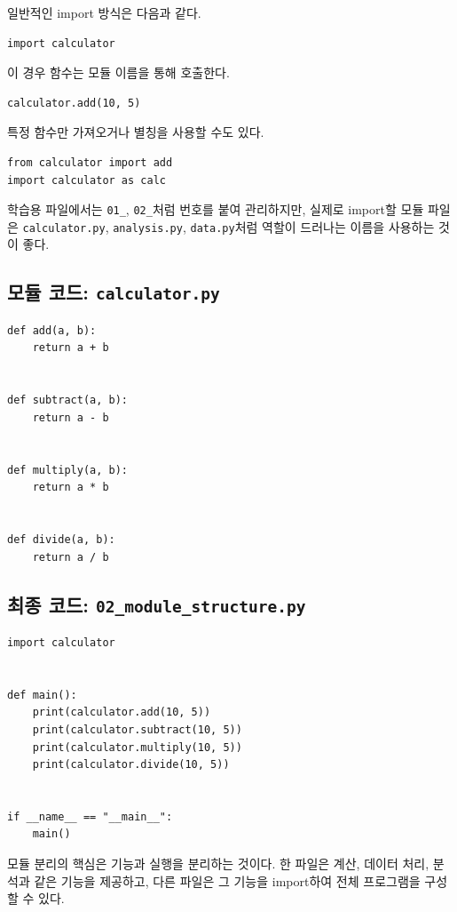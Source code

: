 \documentclass[11pt,a4paper]{article}
\begin{document}
일반적인 import 방식은 다음과 같다.

\begin{lstlisting}
import calculator
\end{lstlisting}

이 경우 함수는 모듈 이름을 통해 호출한다.

\begin{lstlisting}
calculator.add(10, 5)
\end{lstlisting}

특정 함수만 가져오거나 별칭을 사용할 수도 있다.

\begin{lstlisting}
from calculator import add
import calculator as calc
\end{lstlisting}

학습용 파일에서는 \texttt{01\_}, \texttt{02\_}처럼 번호를 붙여 관리하지만, 실제로 import할 모듈 파일은 \texttt{calculator.py}, \texttt{analysis.py}, \texttt{data.py}처럼 역할이 드러나는 이름을 사용하는 것이 좋다.

\subsection{모듈 코드: \texttt{calculator.py}}

\begin{lstlisting}
def add(a, b):
    return a + b


def subtract(a, b):
    return a - b


def multiply(a, b):
    return a * b


def divide(a, b):
    return a / b
\end{lstlisting}

\subsection{최종 코드: \texttt{02\_module\_structure.py}}

\begin{lstlisting}
import calculator


def main():
    print(calculator.add(10, 5))
    print(calculator.subtract(10, 5))
    print(calculator.multiply(10, 5))
    print(calculator.divide(10, 5))


if __name__ == "__main__":
    main()
\end{lstlisting}

\begin{importantbox}
모듈 분리의 핵심은 기능과 실행을 분리하는 것이다. 한 파일은 계산, 데이터 처리, 분석과 같은 기능을 제공하고, 다른 파일은 그 기능을 import하여 전체 프로그램을 구성할 수 있다.
\end{importantbox}
\end{document}
